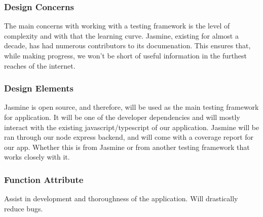 \documentclass[onecolumn, draftclsnofoot,10pt, compsoc]{IEEEtran}
\begin{document}
\subsubsection{Design Concerns}
\noindent The main concerns with working with a testing framework is the level 
of complexity and with that the learning curve.
Jasmine, existing for almost a decade, has had numerous contributors to its 
documenation. This ensures that, while making progress,
we won't be short of useful information in the furthest reaches of the 
internet. \\

\subsubsection{Design Elements}
\noindent Jasmine is open source, and therefore, will be used as the main testing framework for application.
It will be one of the developer dependencies and will mostly interact with the existing javascript/typescript of our application.
Jasmine will be ran through our node express backend, and will come with a coverage report for our app. Whether this is from Jasmine or
from another testing framework that works closely with it. \\

\subsubsection{Function Attribute}
\noindent Assist in development and thoroughness of the application. Will drastically reduce bugs. \\

\newpage
\end{document}

